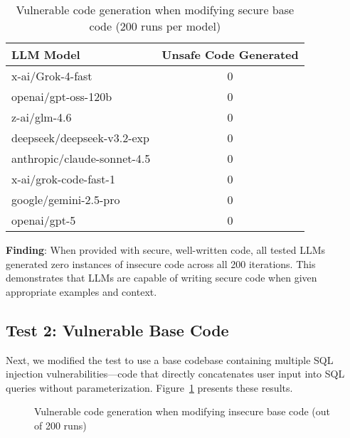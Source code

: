 \documentclass[11pt,a4paper]{article}
\begin{document}
\begin{table}[h]
\centering
\caption{Vulnerable code generation when modifying secure base code (200 runs per model)}
\label{tab:secure_base}
\begin{tabular}{lc}
\toprule
\textbf{LLM Model} & \textbf{Unsafe Code Generated} \\
\midrule
x-ai/Grok-4-fast & 0 \\
openai/gpt-oss-120b & 0 \\
z-ai/glm-4.6 & 0 \\
deepseek/deepseek-v3.2-exp & 0 \\
anthropic/claude-sonnet-4.5 & 0 \\
x-ai/grok-code-fast-1 & 0 \\
google/gemini-2.5-pro & 0 \\
openai/gpt-5 & 0 \\
\bottomrule
\end{tabular}
\end{table}

\textbf{Finding}: When provided with secure, well-written code, all tested LLMs generated zero instances of insecure code across all 200 iterations. This demonstrates that LLMs are capable of writing secure code when given appropriate examples and context.

\subsection{Test 2: Vulnerable Base Code}

Next, we modified the test to use a base codebase containing multiple SQL injection vulnerabilities---code that directly concatenates user input into SQL queries without parameterization. Figure~\ref{fig:vuln_base} presents these results.

\begin{figure}[h]
\centering
{}
\caption{Vulnerable code generation when modifying insecure base code (out of 200 runs)}
\label{fig:vuln_base}
\end{figure}
\end{document}
